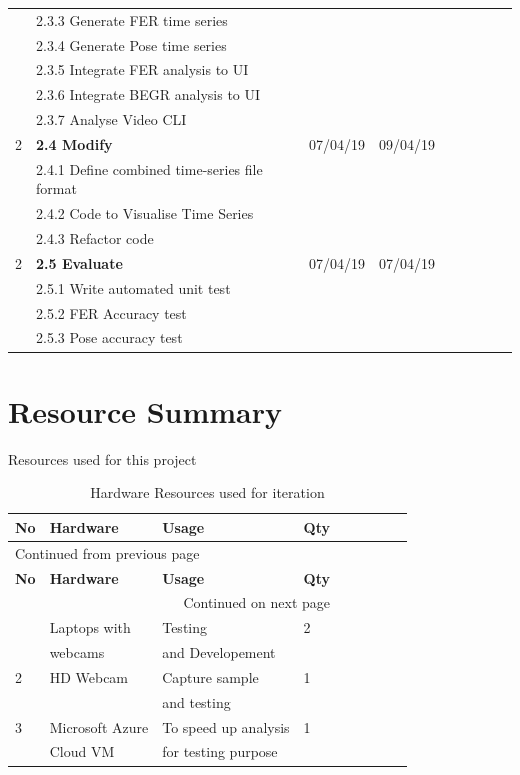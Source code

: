 \documentclass[12pt,a4paper,man]{report}
\begin{document}
\begin{longtable}{|l|l|l|l|l|l|l|lp{3cm}|}
 & 2.3.3 Generate FER time series &  &  & \\
 & 2.3.4 Generate Pose time series &  &  & \\
 & 2.3.5 Integrate FER analysis to UI &  &  & \\
 & 2.3.6 Integrate BEGR analysis to UI &  &  & \\
 & 2.3.7 Analyse Video CLI &  &  & \\
\hline
2 & \textbf{2.4 Modify} & 07/04/19 & 09/04/19 & \\
 & 2.4.1 Define combined time-series file format &  &  & \\
 & 2.4.2 Code to Visualise Time Series &  &  & \\
 & 2.4.3 Refactor code &  &  & \\
\hline
2 & \textbf{2.5 Evaluate} & 07/04/19 & 07/04/19 & \\
 & 2.5.1 Write automated unit test &  &  & \\
 & 2.5.2 FER Accuracy test &  &  & \\
 & 2.5.3 Pose accuracy test &  &  & \\
\hline
\end{longtable}


\section{Resource Summary}
\label{sec:org7d3aaee}
Resources used for this project
\begin{longtable}{|l|l|l|l|l|l|l|lp{3cm}|}
\caption{\label{table: hard_ressumm}
Hardware Resources used for iteration}
\\
\hline
\textbf{No} & \textbf{Hardware} & \textbf{Usage} & \textbf{Qty}\\
\hline
\endfirsthead
\multicolumn{4}{l}{Continued from previous page} \\
\hline

\textbf{No} & \textbf{Hardware} & \textbf{Usage} & \textbf{Qty} \\

\hline
\endhead
\hline\multicolumn{4}{r}{Continued on next page} \\
\endfoot
\endlastfoot
\hline
1 & Laptops with & Testing & 2\\
 & webcams & and Developement & \\
\hline
2 & HD Webcam & Capture sample & 1\\
 &  & and testing & \\
\hline
3 & Microsoft Azure & To speed up analysis & 1\\
 & Cloud VM & for testing purpose & \\
\hline
\end{longtable}
\end{document}
